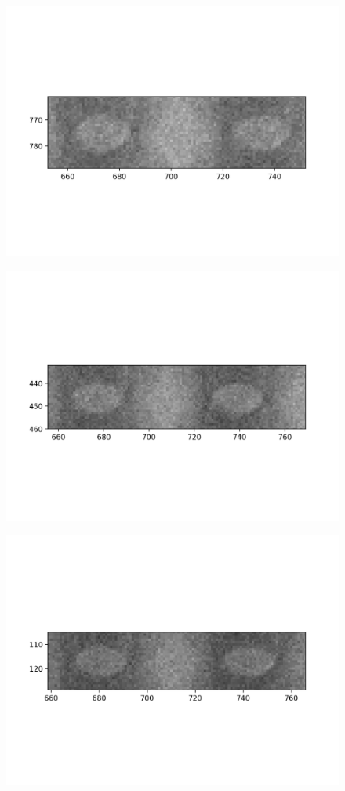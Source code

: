 \documentclass[10pt,a4paper]{article}
\begin{document}
\begin{figure}
	\includegraphics{data/image_stamps/c4}
\end{figure}
\begin{figure}
	\includegraphics{data/image_stamps/c5}
\end{figure}
\begin{figure}
	\includegraphics{data/image_stamps/c6}
\end{figure}
\end{document}

